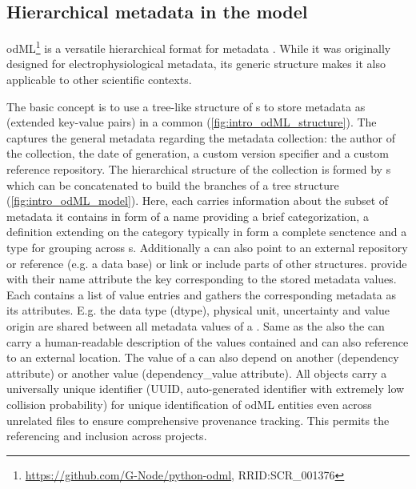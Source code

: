 \subsection{Hierarchical metadata in the  model}
\label{sec:subodML}

odML\footnote{\url{https://github.com/G-Node/python-odml}, RRID:SCR\_001376} is a versatile hierarchical format for metadata \citep{Grewe_2011}. While it was originally designed for electrophysiological metadata, its generic structure makes it also applicable to other scientific contexts.

The basic concept is to use a tree-like structure of s to store metadata as  (extended key-value pairs) in a common  (\cref{fig:intro_odML_structure}). The  captures the general metadata regarding the metadata collection: the author of the collection, the date of generation, a custom version specifier and a custom reference repository. The hierarchical structure of the collection is formed by s which can be concatenated to build the branches of a tree structure (\cref{fig:intro_odML_model}). Here, each  carries information about the subset of metadata it contains in form of a  name providing a brief categorization, a definition extending on the category typically in form a complete senctence and a type for grouping across s. Additionally a  can also point to an external repository or reference (e.g. a data base) or link or include parts of other  structures.  provide with their name attribute the key corresponding to the stored metadata values. Each  contains a list of value entries and gathers the corresponding metadata as its  attributes. E.g. the data type (dtype), physical unit, uncertainty and value origin are shared between all metadata values of a . Same as the  also the  can carry a human-readable description of the values contained and can also reference to an external location. The value of a  can also depend on another  (dependency attribute) or another  value (dependency\_value attribute). All  objects carry a universally unique identifier (UUID, auto-generated identifier with extremely low collision probability) for unique identification of odML entities even across unrelated files to ensure comprehensive provenance tracking. This permits the referencing and inclusion across projects.

